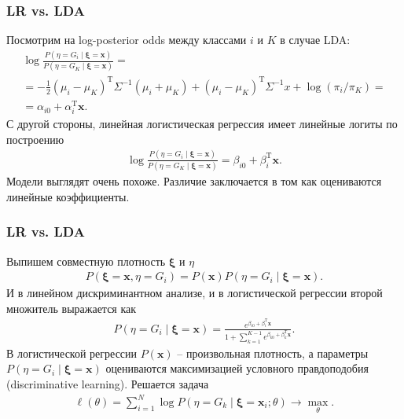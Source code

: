 \documentclass{beamer}
\begin{document}
\begin{frame}
  \frametitle{LR vs. LDA}
  Посмотрим на log-posterior odds между классами $i$ и $K$ в случае LDA:
  \begin{multline*}
    \log \frac{P(\eta = G_i \mid \boldsymbol{\xi} = \mathbf{x})}{P(\eta = G_K \mid \boldsymbol{\xi} = \mathbf{x})} = \\ = -\frac{1}{2} (\mu_i - \mu_K)^\mathrm{T} \Sigma^{-1}(\mu_i + \mu_K) + (\mu_i - \mu_K)^\mathrm{T} \Sigma^{-1}x + \log(\pi_i/\pi_K) = \\
    = \alpha_{i0} + \alpha_i^\mathrm{T}\mathbf{x}.
  \end{multline*}
  С другой стороны, линейная логистическая регрессия имеет линейные логиты по построению
  \begin{align*}
    \log \frac{P(\eta = G_i \mid \boldsymbol{\xi} = \mathbf{x})}{P(\eta = G_K \mid \boldsymbol{\xi} = \mathbf{x})} = \beta_{i0} + \beta_i^\mathrm{T}\mathbf{x}.
  \end{align*}
  Модели выглядят очень похоже. Различие заключается в том как оцениваются линейные коэффициенты.
\end{frame}
\begin{frame}
  \frametitle{LR vs. LDA}
  Выпишем совместную плотность $\boldsymbol{\xi}$ и $\eta$
  \begin{align*}
    P(\boldsymbol{\xi} = \mathbf{x}, \eta = G_i) = P(\mathbf{x})P(\eta = G_i \mid \boldsymbol{\xi} = \mathbf{x}).
  \end{align*}
  И в линейном дискриминантном анализе, и в логистической регрессии второй множитель выражается как
  \begin{align*}
    P(\eta = G_i \mid \boldsymbol{\xi} = \mathbf{x}) = \frac{e^{\beta_{i0} + \beta^\mathrm{T}_i \mathbf{x}}}{1 + \sum_{k = 1}^{K - 1}e^{\beta_{k0} + \beta^\mathrm{T}_k \mathbf{x}}}.
  \end{align*}
  В логистической регрессии $P(\mathbf{x})$ -- произвольная плотность, а параметры $P(\eta = G_i \mid \boldsymbol{\xi} = \mathbf{x})$ оцениваются максимизацией условного правдоподобия (discriminative learning). Решается задача
  \begin{align*}
    \ell(\theta) = \sum_{i = 1}^{N} \log P(\eta = G_k \mid \boldsymbol{\xi} = \mathbf{x}_i; \theta) \rightarrow \max_\theta.
  \end{align*}
\end{frame}
\end{document}

